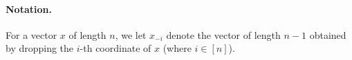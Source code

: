 \paragraph{Notation.}
For a vector $x$ of length $n$, we let $x_{-i}$ denote the vector of length $n-1$ obtained by dropping the $i$-th coordinate of $x$ (where $i \in [n]$).
